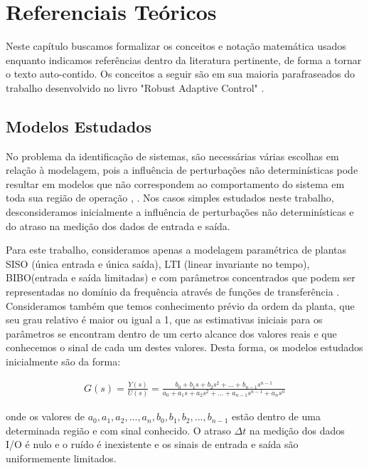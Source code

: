 \documentclass[
	12pt,				%
	openright,			%
	twoside,			%
	a4paper,			%
	english,			%
	french,				%
	spanish,			%
	brazil				%
	]{abntex2}
\begin{document}
\part{Referenciais Teóricos}


Neste capítulo buscamos formalizar os conceitos e notação matemática usados enquanto indicamos referências dentro da literatura pertinente, de forma a tornar o texto auto-contido. Os conceitos a seguir são em sua maioria parafraseados do trabalho desenvolvido no livro "Robust Adaptive Control" \cite{ioannou2}.

\chapter{Modelos Estudados}

 No problema da identificação de sistemas, são necessárias várias escolhas em relação à modelagem, pois a influência de perturbações não determinísticas pode resultar em modelos que não correspondem ao comportamento do sistema em toda sua região de operação \cite{ljung}, \cite{aguirre}. Nos casos simples estudados neste trabalho, desconsideramos inicialmente a influência de perturbações não determinísticas e do atraso na medição dos dados de entrada e saída. 

 Para este trabalho, consideramos apenas a modelagem paramétrica de plantas SISO (única entrada e única saída), LTI (linear invariante no tempo), BIBO(entrada e saída limitadas) e com parâmetros concentrados que podem ser representadas no domínio da frequência através de funções de transferência \cite{chen}\cite{ogata}. Consideramos também que temos conhecimento prévio da ordem da planta, que seu grau relativo é maior ou igual a 1, que as estimativas iniciais para os parâmetros se encontram dentro de um certo alcance dos valores reais e que conhecemos o sinal de cada um destes valores. Desta forma, os modelos estudados inicialmente são da forma:
 
 \begin{align*}
 G(s) = \frac{Y(s)}{U(s)} = \frac{b_0+b_1s+b_2s^2+...+b_{n-1}s^{n-1}}{a_0+a_1s+a_2s^2+...+a_{n-1}s^{n-1}+a_ns^n}
 \end{align*} 

 onde os valores de $a_0, a_1, a_2,...,a_n,b_0,b_1,b_2,...,b_{n-1}$ estão dentro de uma determinada região e com sinal conhecido. O atraso $\Delta t$ na medição dos dados I/O é nulo e o ruído é inexistente e os sinais de entrada e saída são uniformemente limitados. 
\end{document}
